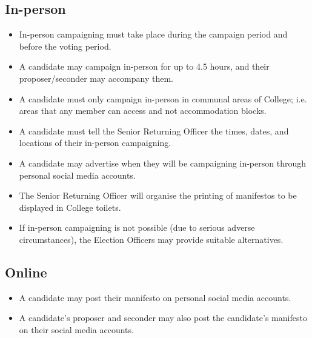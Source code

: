 \documentclass[12pt]{article}
\begin{document}
    \subsection{In-person}
    \begin{itemize}
        \item In-person campaigning must take place during the campaign period and before the voting period.
        \item A candidate may campaign in-person for up to 4.5 hours, and their proposer/seconder may accompany them.
        \item A candidate must only campaign in-person in communal areas of College; i.e. areas that any member can access and not accommodation blocks.
        \item A candidate must tell the Senior Returning Officer the times, dates, and locations of their in-person campaigning.
        \item A candidate may advertise when they will be campaigning in-person through personal social media accounts.
        \item The Senior Returning Officer will organise the printing of manifestos to be displayed in College toilets.
        \item If in-person campaigning is not possible (due to serious adverse circumstances), the Election Officers may provide suitable alternatives.
    \end{itemize}
    \subsection{Online}
    \begin{itemize}
        \item A candidate may post their manifesto on personal social media accounts.
        \item A candidate’s proposer and seconder may also post the candidate’s manifesto on their social media accounts.
    \end{itemize}
\end{document}
